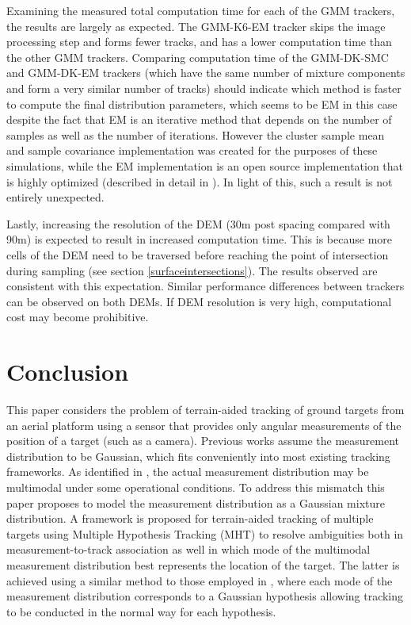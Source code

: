 \documentclass[journal]{IEEEtran}
\begin{document}
Examining the measured total computation time for each of the GMM trackers, the results are largely as expected. The GMM-K6-EM tracker skips the image processing step and forms fewer tracks, and has a lower computation time than the other GMM trackers. Comparing computation time of the GMM-DK-SMC and GMM-DK-EM trackers (which have the same number of mixture components and form a very similar number of tracks) should indicate which method is faster to compute the final distribution parameters, which seems to be EM in this case despite the fact that EM is an iterative method that depends on the number of samples as well as the number of iterations. However the cluster sample mean and sample covariance implementation was created for the purposes of these simulations, while the EM implementation is an open source implementation that is highly optimized (described in detail in \cite{sanderson2017open}). In light of this, such a result is not entirely unexpected.

Lastly, increasing the resolution of the DEM (30m post spacing compared with 90m) is expected to result in increased computation time. This is because more cells of the DEM need to be traversed before reaching the point of intersection during sampling (see section \ref{surfaceintersections}). The results observed are consistent with this expectation. Similar performance differences between trackers can be observed on both DEMs. If DEM resolution is very high, computational cost may become prohibitive.



\section{Conclusion} \label{conclusion}
This paper considers the problem of terrain-aided tracking of ground targets from an aerial platform using a sensor that provides only angular measurements of the position of a target (such as a camera). Previous works assume the measurement distribution to be Gaussian, which fits conveniently into most existing tracking frameworks. As identified in \cite{collins1989terrain,collins1998using,davison1999mobile}, the actual measurement distribution may be multimodal under some operational conditions. To address this mismatch this paper proposes to model the measurement distribution as a Gaussian mixture distribution. A framework is proposed for terrain-aided tracking of multiple targets using Multiple Hypothesis Tracking (MHT) to resolve ambiguities both in measurement-to-track association as well in which mode of the multimodal measurement distribution best represents the location of the target. The latter is achieved using a similar method to those employed in \cite{li2013multitarget,yamada2017multi}, where each mode of the measurement distribution corresponds to a Gaussian hypothesis allowing tracking to be conducted in the normal way for each hypothesis.
\end{document}
